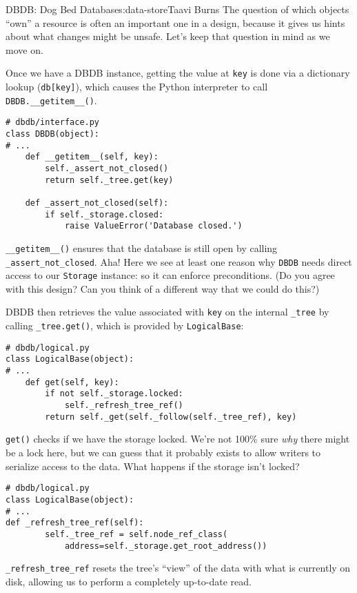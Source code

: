 \begin{aosachapter}{DBDB: Dog Bed Database}{s:data-store}{Taavi Burns}
The question of which objects ``own'' a resource is often an important
one in a design, because it gives us hints about what changes might be
unsafe. Let's keep that question in mind as we move on.

Once we have a DBDB instance, getting the value at \texttt{key} is done
via a dictionary lookup (\texttt{db{[}key{]}}), which causes the Python
interpreter to call \texttt{DBDB.\_\_getitem\_\_()}.

\begin{verbatim}
# dbdb/interface.py
class DBDB(object):
# ...
    def __getitem__(self, key):
        self._assert_not_closed()
        return self._tree.get(key)

    def _assert_not_closed(self):
        if self._storage.closed:
            raise ValueError('Database closed.')
\end{verbatim}

\texttt{\_\_getitem\_\_()} ensures that the database is still open by
calling \texttt{\_assert\_not\_closed}. Aha! Here we see at least one
reason why \texttt{DBDB} needs direct access to our \texttt{Storage}
instance: so it can enforce preconditions. (Do you agree with this
design? Can you think of a different way that we could do this?)

DBDB then retrieves the value associated with \texttt{key} on the
internal \texttt{\_tree} by calling \texttt{\_tree.get()}, which is
provided by \texttt{LogicalBase}:

\begin{verbatim}
# dbdb/logical.py
class LogicalBase(object):
# ...
    def get(self, key):
        if not self._storage.locked:
            self._refresh_tree_ref()
        return self._get(self._follow(self._tree_ref), key)
\end{verbatim}

\texttt{get()} checks if we have the storage locked. We're not 100\%
sure \emph{why} there might be a lock here, but we can guess that it
probably exists to allow writers to serialize access to the data. What
happens if the storage isn't locked?

\begin{verbatim}
# dbdb/logical.py
class LogicalBase(object):
# ...
def _refresh_tree_ref(self):
        self._tree_ref = self.node_ref_class(
            address=self._storage.get_root_address())
\end{verbatim}

\texttt{\_refresh\_tree\_ref} resets the tree's ``view'' of the data
with what is currently on disk, allowing us to perform a completely
up-to-date read.


\end{aosachapter}
